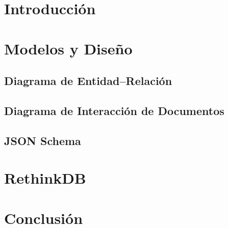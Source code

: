 \documentclass[hidelinks,a4paper,11pt, nofootinbib]{article}
\begin{document}
\maketitle

\tableofcontents
\newpage

\section{Introducción}

\newpage

\section{Modelos y Diseño}
\subsection{Diagrama de Entidad--Relación}

\newpage

\subsection{Diagrama de Interacción de Documentos}

\newpage


\subsection{JSON Schema}

\newpage

\section{RethinkDB}


\newpage


\section{Conclusión}

\newpage


%
%
\end{document}
